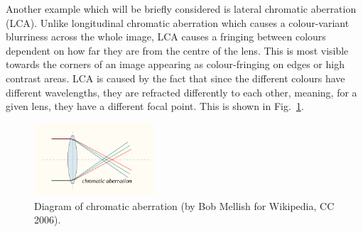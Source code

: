 Another example which will be briefly considered is lateral chromatic aberration (LCA).
Unlike longitudinal chromatic aberration which causes a colour-variant blurriness across the whole image, LCA causes a fringing between colours dependent on how far they are from the centre of the lens.
This is most visible towards the corners of an image appearing as colour-fringing on edges or high contrast areas.
LCA is caused by the fact that since the different colours have different wavelengths, they are refracted differently to each other, meaning, for a given lens, they have a different focal point.
This is shown in Fig.~\ref{fig:chromatic-aberration}.

\begin{figure}[ht]
    \centering
    \includegraphics[width=0.4\textwidth]{figures/ca}
    \caption{Diagram of chromatic aberration (by Bob Mellish for Wikipedia, CC 2006).}
    \label{fig:chromatic-aberration}
\end{figure}
